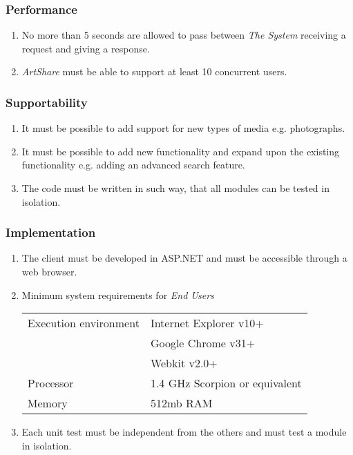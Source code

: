 \documentclass[../report.tex]{subfiles}
\begin{document}
\subsubsection{Performance}

\begin{enumerate}[label=\textbf{NFR-\twodigits*}, resume]
\item No more than 5 seconds are allowed to pass between \textit{The System} receiving a request and giving a response.
\item \textit{ArtShare} must be able to support at least 10 concurrent users. 
\end{enumerate}

\subsubsection{Supportability}

\begin{enumerate}[label=\textbf{NFR-\twodigits*}, resume]
\item It must be possible to add support for new types of media e.g. photographs.
\item It must be possible to add new functionality and expand upon the existing functionality e.g. adding an advanced search feature.
\item The code must be written in such way, that all modules can be tested in isolation.
\end{enumerate}

\subsubsection{Implementation}
\begin{enumerate}[label=\textbf{NFR-\twodigits*}, resume]
\item The client must be developed in ASP.NET and must be accessible through a web browser.
\item Minimum system requirements for \textit{End Users}


\begin{tabular}{| l | l | }
\hline
 Execution environment & Internet Explorer v10+\\
& Google Chrome v31+\\
& Webkit v2.0+\\ \hline
 Processor & 1.4 GHz Scorpion or equivalent \\ \hline
 Memory & 512mb RAM  \\ \hline

\end{tabular}

\item Each unit test must be independent from the others and must test a module in isolation.
\end{enumerate}


\end{document}
